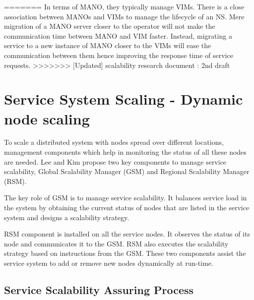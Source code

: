=======
In terms of MANO, they typically manage VIMs. There is a close association between MANOs and VIMs to manage the lifecycle of an NS.
Mere migration of a MANO server closer to the operator will not make the communication time between MANO and VIM faster. Instead, migrating a service to a new instance of MANO closer to the VIMs will ease the communication between them hence improving the response time of service requests.
>>>>>>> [Updated] scalability research document : 2nd draft

\section{Service System Scaling - Dynamic node scaling}

To scale a distributed system with nodes spread over different locations, management components which help in monitoring the status of all these nodes are needed. Lee and Kim \cite{lee_software_2010} propose two key components to manage service scalability, Global Scalability Manager (GSM) and Regional Scalability Manager (RSM).

The key role of GSM is to manage service scalability. It balances service load in the system by obtaining the current status of nodes that are listed in the service system and designs a scalability strategy.

RSM component is installed on all the service nodes. It observes the status of its node and communicates it to the GSM. RSM also executes the scalability strategy based on instructions from the GSM. These two components assist the service system to add or remove new nodes dynamically at run-time.

\subsection{Service Scalability Assuring Process}


